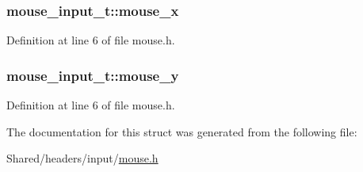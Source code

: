 \hypertarget{structmouse__input__t_a9eef7720663489827c9a6bdeef2e85fd}{
\subsubsection[{mouse\_\-x}]{ {\bf mouse\_\-input\_\-t::mouse\_\-x}}}
\label{structmouse__input__t_a9eef7720663489827c9a6bdeef2e85fd}


Definition at line 6 of file mouse.h.

\hypertarget{structmouse__input__t_ad442be4c0b784a68a039ee0b84f53b24}{
\subsubsection[{mouse\_\-y}]{ {\bf mouse\_\-input\_\-t::mouse\_\-y}}}
\label{structmouse__input__t_ad442be4c0b784a68a039ee0b84f53b24}


Definition at line 6 of file mouse.h.



The documentation for this struct was generated from the following file:\begin{DoxyCompactItemize}
\item 
Shared/headers/input/\hyperlink{mouse_8h}{mouse.h}\end{DoxyCompactItemize}
